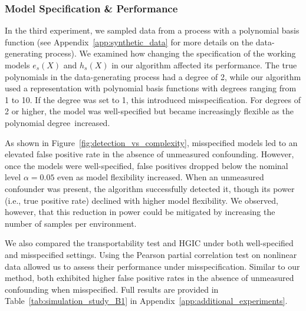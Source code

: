 \documentclass{article}
\begin{document}
\subsubsection{Model Specification \& Performance} \label{sec:model_specification_experiment}
In the third experiment, we sampled data from a process with a polynomial basis function (see Appendix~\ref{app:synthetic_data} for more details on the data-generating process).  We examined how changing the specification of the working models $e_s(X)$ and $h_s(X)$ in our algorithm affected its performance. The true polynomials in the data-generating process had a degree of 2, while our algorithm used a representation with polynomial basis functions with degrees ranging from 1 to 10. If the degree was set to 1, this introduced misspecification. For degrees of 2 or higher, the model was well-specified but became increasingly flexible as the polynomial degree~increased.

As shown in Figure~\ref{fig:detection_vs_complexity}, misspecified models led to an elevated false positive rate in the absence of unmeasured confounding. However, once the models were well-specified, false positives dropped below the nominal level $\alpha=0.05$ even as model flexibility increased. When an unmeasured confounder was present, the algorithm successfully detected it, though its power (i.e., true positive rate) declined with higher model flexibility. We observed, however, that this reduction in power could be mitigated by increasing the number of samples per environment.

We also compared the transportability test and HGIC under both well-specified and misspecified settings. Using the Pearson partial correlation test on nonlinear data allowed us to assess their performance under misspecification. Similar to our method, both exhibited higher false positive rates in the absence of unmeasured confounding when misspecified. Full results are provided in Table~\ref{tab:simulation_study_B1} in Appendix~\ref{app:additional_experiments}.
\end{document}
